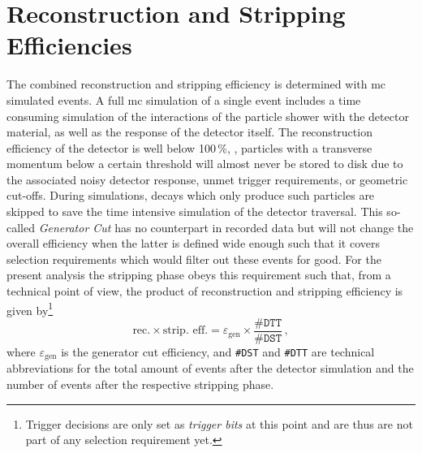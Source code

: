 \chapter{Reconstruction and Stripping Efficiencies}
\label{chap:stripeff}
The combined reconstruction and \gls{stripping} efficiency is determined with \gls{mc} simulated events.
A full \gls{mc} simulation of a single event includes a time consuming simulation of the interactions of the particle shower with the detector material, as well as the response of the detector itself.
The reconstruction efficiency of the \lhcb detector is well below 100\,\%, \eg{}, particles with a transverse momentum below a certain threshold will almost never be stored to disk due to the associated noisy detector response, unmet trigger requirements, or geometric cut-offs.
During simulations, decays which only produce such particles are skipped to save the time intensive simulation of the detector traversal.
This so-called \textit{Generator Cut} has no counterpart in recorded data but will not change the overall efficiency when the latter is defined wide enough such that it covers selection requirements which would filter out these events for good.
For the present analysis the \gls{stripping} phase obeys this requirement such that, from a technical point of view, the product of reconstruction and \gls{stripping} efficiency is given by\footnote{Trigger decisions are only set as \textit{trigger bits} at this point and are thus are not part of any selection requirement yet.}
\begin{equation}
    \label{eq:stripeff_defeps}
    \text{rec.} \times \text{strip.\ eff.} = \varepsilon_{\text{gen}} \times \frac{\texttt{\#DTT}}{\texttt{\#DST}} \,,
\end{equation}
where $\varepsilon_{\text{gen}}$ is the generator cut efficiency, and \texttt{\#DST} and \texttt{\#DTT} are technical abbreviations for the total amount of events after the detector simulation and the number of events after the respective \gls{stripping} phase.

